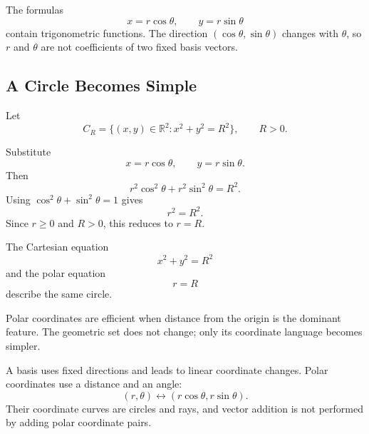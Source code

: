 \begin{interpretationbox}
The formulas
\[
x=r\cos\theta,
\qquad
y=r\sin\theta
\]
contain trigonometric functions. The direction $(\cos\theta,\sin\theta)$ changes
with $\theta$, so $r$ and $\theta$ are not coefficients of two fixed basis
vectors.
\end{interpretationbox}

\subsection*{A Circle Becomes Simple}

Let
\[
C_R=\{(x,y)\in\mathbb R^2:x^2+y^2=R^2\},
\qquad R>0.
\]

\begin{derivationbox}
Substitute
\[
x=r\cos\theta,
\qquad
y=r\sin\theta.
\]
Then
\[
r^2\cos^2\theta+r^2\sin^2\theta=R^2.
\]
Using $\cos^2\theta+\sin^2\theta=1$ gives
\[
r^2=R^2.
\]
Since $r\geq0$ and $R>0$, this reduces to $r=R$.
\end{derivationbox}

\begin{theorembox}
The Cartesian equation
\[
x^2+y^2=R^2
\]
and the polar equation
\[
\boxed{r=R}
\]
describe the same circle.
\end{theorembox}

\begin{interpretationbox}
Polar coordinates are efficient when distance from the origin is the dominant
feature. The geometric set does not change; only its coordinate language becomes
simpler.
\end{interpretationbox}

\begin{center}
\end{center}

\begin{summarybox}
A basis uses fixed directions and leads to linear coordinate changes. Polar
coordinates use a distance and an angle:
\[
(r,\theta)\longleftrightarrow(r\cos\theta,r\sin\theta).
\]
Their coordinate curves are circles and rays, and vector addition is not
performed by adding polar coordinate pairs.
\end{summarybox}
